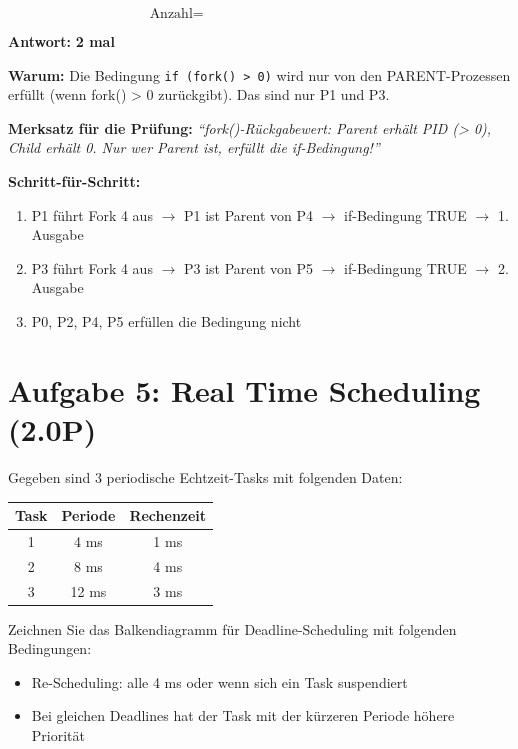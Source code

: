 \documentclass[a4paper,11pt]{article}
\begin{document}
\[
\text{Anzahl} = \hspace{5cm}
\]

\begin{tcolorbox}[colback=green!15!white,colframe=green!70!black,title=\textbf{Lösung Aufgabe 4b}]
\textbf{Antwort:} \textbf{2 mal}

\textbf{Warum:} Die Bedingung \texttt{if (fork() > 0)} wird nur von den PARENT-Prozessen erfüllt (wenn fork() \textasciigrave > 0 zurückgibt). Das sind nur P1 und P3.

\textbf{Merksatz für die Prüfung:} \textit{``fork()-Rückgabewert: Parent erhält PID (> 0), Child erhält 0. Nur wer Parent ist, erfüllt die if-Bedingung!''}

\textbf{Schritt-für-Schritt:}
\begin{enumerate}[leftmargin=*]
  \item P1 führt Fork 4 aus $\rightarrow$ P1 ist Parent von P4 $\rightarrow$ if-Bedingung TRUE $\rightarrow$ 1. Ausgabe
  \item P3 führt Fork 4 aus $\rightarrow$ P3 ist Parent von P5 $\rightarrow$ if-Bedingung TRUE $\rightarrow$ 2. Ausgabe
  \item P0, P2, P4, P5 erfüllen die Bedingung nicht
\end{enumerate}
\end{tcolorbox}

\section{Aufgabe 5: Real Time Scheduling (2.0P)}
Gegeben sind 3 periodische Echtzeit-Tasks mit folgenden Daten:

\begin{center}
\begin{tabular}{|c|c|c|}
\hline
\textbf{Task} & \textbf{Periode} & \textbf{Rechenzeit} \\
\hline
1 & 4 ms & 1 ms \\
2 & 8 ms & 4 ms \\
3 & 12 ms & 3 ms \\
\hline
\end{tabular}
\end{center}

Zeichnen Sie das Balkendiagramm für Deadline-Scheduling mit folgenden Bedingungen:
\begin{itemize}[leftmargin=*]
  \item Re-Scheduling: alle 4 ms oder wenn sich ein Task suspendiert
  \item Bei gleichen Deadlines hat der Task mit der kürzeren Periode höhere Priorität
\end{itemize}
\end{document}
